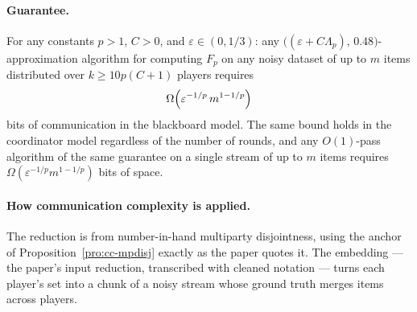 \paragraph{Guarantee.}

\begin{theorem}\label{thm:cc-fp-lb}
For any constants $p > 1$, $C > 0$, and $\varepsilon \in (0, 1/3)$: any
$\bigl((\varepsilon + C\Lambda_p),\, 0.48\bigr)$-approximation algorithm for computing
$F_p$ on any noisy dataset of up to $m$ items distributed over $k \ge 10p(C+1)$
players requires
\[
\Omega\Bigl(\varepsilon^{-1/p}\, m^{1-1/p}\Bigr)
\]
bits of communication in the blackboard model. The same bound holds in the
coordinator model regardless of the number of rounds, and any $O(1)$-pass algorithm of
the same guarantee on a single stream of up to $m$ items requires
$\Omega(\varepsilon^{-1/p} m^{1-1/p})$ bits of space. \eop
\end{theorem}


\paragraph{How communication complexity is applied.}
The reduction is from number-in-hand multiparty disjointness, using the anchor of
Proposition~\ref{pro:cc-mpdisj} exactly as the paper quotes it. The embedding --- the
paper's input reduction, transcribed with cleaned notation --- turns each player's
set into a chunk of a noisy stream whose ground truth merges items across players.


